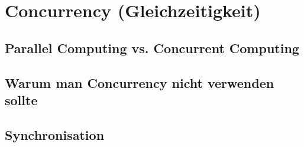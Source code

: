\section{Concurrency (Gleichzeitigkeit)}

\subsection{Parallel Computing vs. Concurrent Computing}


\subsection{Warum man Concurrency nicht verwenden sollte}


\subsection{Synchronisation}

